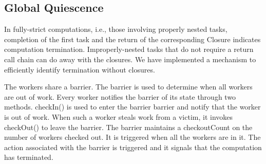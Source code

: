%
%
%
\subsection{Global Quiescence}

In fully-strict computations, i.e., those involving properly nested
tasks, completion of the first task and the return of the
corresponding Closure indicates computation termination.
Improperly-nested tasks that do not require a return call chain can do
away with the closures. We have implemented a mechanism to efficiently
identify termination without closures.

The workers share a barrier. The barrier is used to determine when all
workers are out of work. Every worker notifies the barrier of its
state through two methods. {\java checkIn()} is used to enter the
barrier barrier and notify that the worker is out of work. When such a
worker steals work from a victim, it invokes {\java checkOut()} to
leave the barrier. The barrier maintains a {\java checkoutCount} on
the number of workers checked out. It is triggered when all the workers
are in it. The action associated with the barrier is triggered and it
signals that the computation has terminated.

